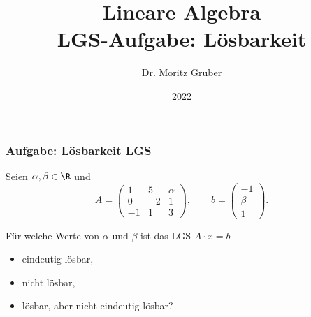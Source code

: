 

\title{Lineare Algebra\\[3mm] 
	\large LGS-Aufgabe: Lösbarkeit
}
\author{Dr. Moritz Gruber} 
\date{2022}



%
\begin{frame}[plain] 
 \titlepage
\end{frame}
%
\begin{frame}\frametitle{Aufgabe: Lösbarkeit LGS}
%
Seien $\alpha,\beta \in \R$ und
$$
	A =
	\begin{pmatrix}
		1	&5	&\alpha	\\
		0	&-2	&1	\\
		-1	&1	&3
	\end{pmatrix},
	\qquad
	b =
	\begin{pmatrix}
		-1	\\
		\beta	\\
		1
	\end{pmatrix}.
$$

F\"ur welche Werte von $\alpha$ und $\beta$ ist das LGS $A\cdot x = b$
\begin{itemize}
	\item eindeutig l\"osbar,
	\item nicht l\"osbar,
	\item l\"osbar, aber nicht eindeutig l\"osbar?
\end{itemize}


%
\end{frame}
%
%
